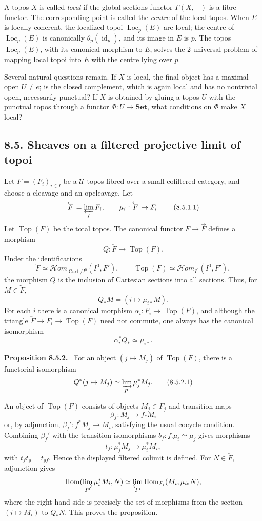 \documentclass[11pt]{article}
\newcommand{\U}{\mathcal{U}}
\newcommand{\Ens}{\mathbf{Set}}
\newcommand{\Top}{\operatorname{Top}}
\newcommand{\Hom}{\operatorname{Hom}}
\newcommand{\id}{\operatorname{id}}
\newcommand{\Cart}{\operatorname{Cart}}
\newcommand{\Loc}{\operatorname{Loc}}
\newenvironment{statement}[1]{\par\medskip\noindent\textbf{#1.}\ }{\par\medskip}
\begin{document}
A topos \(X\) is called \emph{local} if the global-sections functor \(\Gamma(X,-)\) is a fibre functor. The corresponding point is called the \emph{centre} of the local topos. When \(E\) is locally coherent, the localized topoi \(\Loc_p(E)\) are local; the centre of \(\Loc_p(E)\) is canonically \(\theta_p(\id_p)\), and its image in \(E\) is \(p\). The topos \(\Loc_p(E)\), with its canonical morphism to \(E\), solves the 2-universal problem of mapping local topoi into \(E\) with the centre lying over \(p\).

Several natural questions remain. If \(X\) is local, the final object has a maximal open \(U\ne e\); is the closed complement, which is again local and has no nontrivial open, necessarily punctual? If \(X\) is obtained by gluing a topos \(U\) with the punctual topos through a functor \(\Phi:U\to\Ens\), what conditions on \(\Phi\) make \(X\) local?

\subsection*{8.5. Sheaves on a filtered projective limit of topoi}

Let \(F=(F_i)_{i\in I}\) be a \(\U\)-topos fibred over a small cofiltered category, and choose a cleavage and an opcleavage. Let
\[
 \overleftarrow F=\varprojlim_I F_i,
 \qquad \mu_i:\overleftarrow F\to F_i. \tag{8.5.1.1}
\]
Let \(\Top(F)\) be the total topos. The canonical functor \(F\to\overrightarrow F\) defines a morphism
\[
 Q:\overleftarrow F\to\Top(F). \tag{8.5.1.2}
\]
Under the identifications
\[
 \overleftarrow F\simeq\mathcal{H}om_{\Cart/I^0}(I^0,F'),
 \qquad
 \Top(F)\simeq\mathcal{H}om_{I^0}(I^0,F'),
\]
the morphism \(Q\) is the inclusion of Cartesian sections into all sections. Thus, for \(M\in\overleftarrow F\),
\[
 Q_*M=(i\mapsto\mu_{i*}M). \tag{8.5.1.3}
\]
For each \(i\) there is a canonical morphism \(\alpha_i:F_i\to\Top(F)\), and although the triangle \(\overleftarrow F\to F_i\to\Top(F)\) need not commute, one always has the canonical isomorphism
\[
 \alpha_i^*Q_*\simeq\mu_{i*}. \tag{8.5.1.6}
\]

\begin{statement}{Proposition 8.5.2}
For an object \((j\mapsto M_j)\) of \(\Top(F)\), there is a functorial isomorphism
\[
 Q^*(j\mapsto M_j)\simeq \varinjlim_{I^0}\mu_j^*M_j. \tag{8.5.2.1}
\]
\end{statement}
An object of \(\Top(F)\) consists of objects \(M_j\in F_j\) and transition maps
\[
 \beta_f:M_j\to f_*M_i \tag{8.5.2.2}
\]
or, by adjunction, \(\beta_f':f^*M_j\to M_i\), satisfying the usual cocycle condition. Combining \(\beta_f'\) with the transition isomorphisms \(b_f:f.\mu_i\simeq\mu_j\) gives morphisms
\[
 t_f:\mu_j^*M_j\to\mu_i^*M_i, \tag{8.5.2.6}
\]
with \(t_ft_g=t_{gf}\). Hence the displayed filtered colimit is defined. For \(N\in\overleftarrow F\), adjunction gives
\[
 \Hom(\varinjlim_{I^0}\mu_i^*M_i,N)
 \simeq \varprojlim_{I^0}\Hom_{F_i}(M_i,\mu_{i*}N),
\]
where the right hand side is precisely the set of morphisms from the section \((i\mapsto M_i)\) to \(Q_*N\). This proves the proposition.
\end{document}
